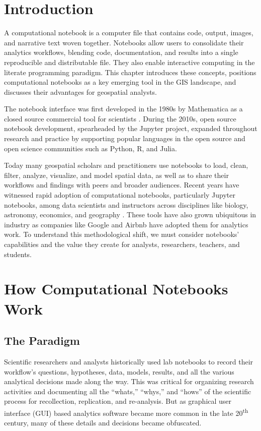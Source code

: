 \documentclass[11pt,letterpaper]{article}
\begin{document}
\section{Introduction}

A computational notebook is a computer file that contains code, output, images, and narrative text woven together. Notebooks allow users to consolidate their analytics workflows, blending code, documentation, and results into a single reproducible and distributable file. They also enable interactive computing in the literate programming paradigm. This chapter introduces these concepts, positions computational notebooks as a key emerging tool in the GIS landscape, and discusses their advantages for geospatial analysts.

The notebook interface was first developed in the 1980s by Mathematica as a closed source commercial tool for scientists \citep{somers_scientific_2018}. During the 2010s, open source notebook development, spearheaded by the Jupyter project, expanded throughout research and practice by supporting popular languages in the open source and open science communities such as Python, R, and Julia.

Today many geospatial scholars and practitioners use notebooks to load, clean, filter, analyze, visualize, and model spatial data, as well as to share their workflows and findings with peers and broader audiences. Recent years have witnessed rapid adoption of computational notebooks, particularly Jupyter notebooks, among data scientists and instructors across disciplines like biology, astronomy, economics, and geography \citep{perkel_why_2018}. These tools have also grown ubiquitous in industry as companies like Google and Airbnb have adopted them for analytics work. To understand this methodological shift, we must consider notebooks' capabilities and the value they create for analysts, researchers, teachers, and students.

\section{How Computational Notebooks Work}

\subsection{The Paradigm}

Scientific researchers and analysts historically used lab notebooks to record their workflow's questions, hypotheses, data, models, results, and all the various analytical decisions made along the way. This was critical for organizing research activities and documenting all the \enquote{whats,} \enquote{whys,} and \enquote{hows} of the scientific process for recollection, replication, and re-analysis. But as graphical user interface (GUI) based analytics software became more common in the late 20\textsuperscript{th} century, many of these details and decisions became obfuscated.
\end{document}
